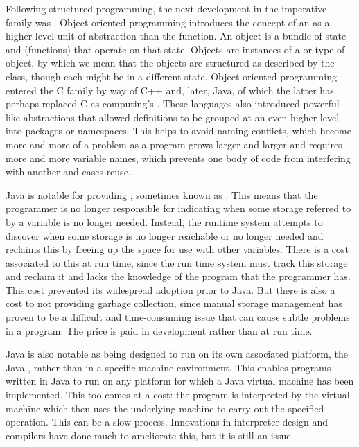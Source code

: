 Following structured programming, the next development in the imperative family was . Object-oriented programming introduces the concept of an  as a higher-level unit of abstraction than the function. An object is a bundle of state and  (functions) that operate on that state. Objects are instances of a  or type of object, by which we mean that the objects are structured as described by the class, though each might be in a different state. Object-oriented programming entered the C family by way of C++ and, later, Java, of which the latter has perhaps replaced C as computing's . These languages also introduced powerful -like abstractions that allowed definitions to be grouped at an even higher level into packages or namespaces. This helps to avoid naming conflicts, which become more and more of a problem as a program grows larger and larger and requires more and more variable names, which prevents one body of code from interfering with another and eases reuse.

Java is notable for providing , sometimes known as . This means that the programmer is no longer responsible for indicating when some storage referred to by a variable is no longer needed. Instead, the runtime system attempts to discover when some storage is no longer reachable or no longer needed and reclaims this by freeing up the space for use with other variables. There is a cost associated to this at run time, since the run time system must track this storage and reclaim it and lacks the knowledge of the program that the programmer has. This cost prevented its widespread adoption prior to Java. But there is also a cost to not providing garbage collection, since manual storage management has proven to be a difficult and time-consuming issue that can cause subtle problems in a program. The price is paid in development rather than at run time.

Java is also notable as being designed to run on its own associated platform, the Java , rather than in a specific machine environment. This enables programs written in Java to run on any platform for which a Java virtual machine has been implemented. This too comes at a cost: the program is interpreted by the virtual machine which then uses the underlying machine to carry out the specified operation. This can be a slow process. Innovations in interpreter design and compilers have done much to ameliorate this, but it is still an issue.

